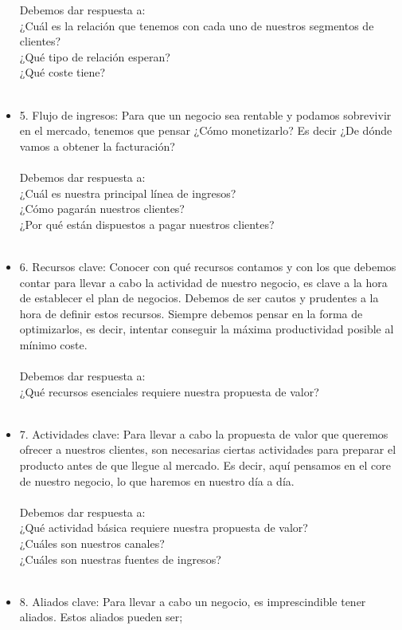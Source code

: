 \documentclass[%
 reprint,
 amsmath,amssymb,
 aps,
]{revtex4-1}
\begin{document}
\begin{itemize}
Debemos dar respuesta a:\\
¿Cuál es la relación que tenemos con cada uno de nuestros segmentos de clientes?\\
¿Qué tipo de relación esperan?\\
¿Qué coste tiene?\\\\
	\item 5. Flujo de ingresos: Para que un negocio sea rentable y podamos sobrevivir en el mercado, tenemos que pensar ¿Cómo monetizarlo? Es decir ¿De dónde vamos a obtener la facturación?\\\\
Debemos dar respuesta a:\\
¿Cuál es nuestra principal línea de ingresos? \\
¿Cómo pagarán nuestros clientes?\\
¿Por qué están dispuestos a pagar nuestros clientes?\\\\
\item 6. Recursos clave: Conocer con qué recursos contamos y con los que debemos contar para llevar a cabo la actividad de nuestro negocio, es clave a la hora de establecer el plan de negocios. Debemos de ser cautos y prudentes a la hora de definir estos recursos. Siempre debemos pensar en la forma de optimizarlos, es decir, intentar conseguir la máxima productividad posible al mínimo coste.\\\\
Debemos dar respuesta a:\\
¿Qué recursos esenciales requiere nuestra propuesta de valor?\\\\
\item 7. Actividades clave: Para llevar a cabo la propuesta de valor que queremos ofrecer a nuestros clientes, son necesarias ciertas actividades para preparar el producto antes de que llegue al mercado. Es decir, aquí pensamos en el core de nuestro negocio, lo que haremos en nuestro día a día.\\\\
Debemos dar respuesta a:\\
¿Qué actividad básica requiere nuestra propuesta de valor?\\
¿Cuáles son nuestros canales?\\
¿Cuáles son nuestras fuentes de ingresos?\\\\
\item 8. Aliados clave: Para llevar a cabo un negocio, es imprescindible tener aliados. Estos aliados pueden ser;\\\\

\end{itemize}
\end{document}

